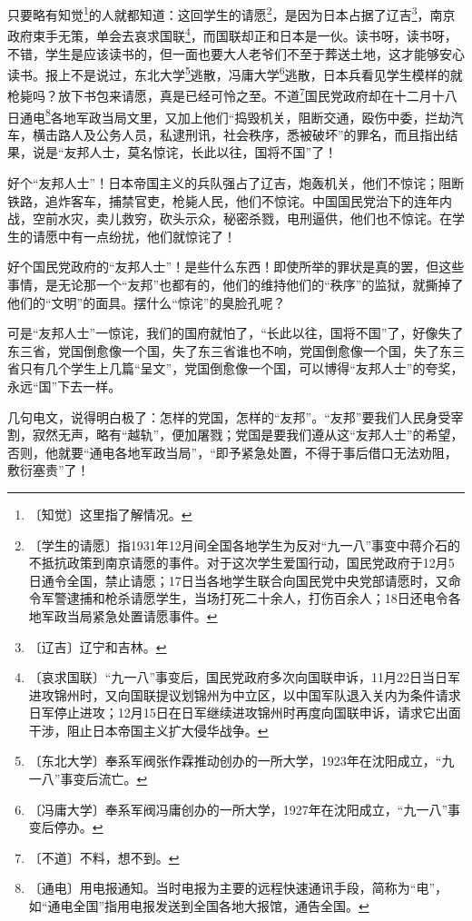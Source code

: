 \documentclass[12pt,UTF-8,openany]{ctexbook}
\begin{document}
\begin{normalsize}
    
    只要略有知觉\footnote{〔知觉〕这里指了解情况。}的人就都知道：这回学生的请愿\footnote{〔学生的请愿〕指1931年12月间全国各地学生为反对“九一八”事变中蒋介石的不抵抗政策到南京请愿的事件。对于这次学生爱国行动，国民党政府于12月5日通令全国，禁止请愿；17日当各地学生联合向国民党中央党部请愿时，又命令军警逮捕和枪杀请愿学生，当场打死二十余人，打伤百余人；18日还电令各地军政当局紧急处置请愿事件。}，是因为日本占据了辽吉\footnote{〔辽吉〕辽宁和吉林。}，南京政府束手无策，单会去哀求国联\footnote{〔哀求国联〕“九一八”事变后，国民党政府多次向国联申诉，11月22日当日军进攻锦州时，又向国联提议划锦州为中立区，以中国军队退入关内为条件请求日军停止进攻；12月15日在日军继续进攻锦州时再度向国联申诉，请求它出面干涉，阻止日本帝国主义扩大侵华战争。}，而国联却正和日本是一伙。读书呀，读书呀，不错，学生是应该读书的，但一面也要大人老爷们不至于葬送土地，这才能够安心读书。报上不是说过，东北大学\footnote{〔东北大学〕奉系军阀张作霖推动创办的一所大学，1923年在沈阳成立，“九一八”事变后流亡。}逃散，冯庸大学\footnote{〔冯庸大学〕奉系军阀冯庸创办的一所大学，1927年在沈阳成立，“九一八”事变后停办。}逃散，日本兵看见学生模样的就枪毙吗？放下书包来请愿，真是已经可怜之至。不道\footnote{〔不道〕不料，想不到。}国民党政府却在十二月十八日通电\footnote{〔通电〕用电报通知。当时电报为主要的远程快速通讯手段，简称为“电”，如“通电全国”指用电报发送到全国各地大报馆，通告全国。}各地军政当局文里，又加上他们“捣毁机关，阻断交通，殴伤中委，拦劫汽车，横击路人及公务人员，私逮刑讯，社会秩序，悉被破坏”的罪名，而且指出结果，说是“友邦人士，莫名惊诧，长此以往，国将不国”了！
    
    好个“友邦人士”！日本帝国主义的兵队强占了辽吉，炮轰机关，他们不惊诧；阻断铁路，追炸客车，捕禁官吏，枪毙人民，他们不惊诧。中国国民党治下的连年内战，空前水灾，卖儿救穷，砍头示众，秘密杀戮，电刑逼供，他们也不惊诧。在学生的请愿中有一点纷扰，他们就惊诧了！
    
    好个国民党政府的“友邦人士”！是些什么东西！即使所举的罪状是真的罢，但这些事情，是无论那一个“友邦”也都有的，他们的维持他们的“秩序”的监狱，就撕掉了他们的“文明”的面具。摆什么“惊诧”的臭脸孔呢？
    
    可是“友邦人士”一惊诧，我们的国府就怕了，“长此以往，国将不国”了，好像失了东三省，党国倒愈像一个国，失了东三省谁也不响，党国倒愈像一个国，失了东三省只有几个学生上几篇“呈文”，党国倒愈像一个国，可以博得“友邦人士”的夸奖，永远“国”下去一样。
    
    几句电文，说得明白极了：怎样的党国，怎样的“友邦”。“友邦”要我们人民身受宰割，寂然无声，略有“越轨”，便加屠戮；党国是要我们遵从这“友邦人士”的希望，否则，他就要“通电各地军政当局”，“即予紧急处置，不得于事后借口无法劝阻，敷衍塞责”了！
    

\end{normalsize}
\end{document}
